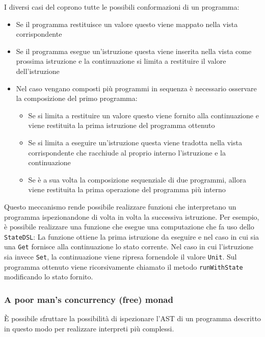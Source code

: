 I diversi casi del  coprono tutte le possibili conformazioni di un programma:
\begin{itemize}
  \item Se il programma restituisce un valore questo viene mappato nella vista corrispondente
  \item Se il programma esegue un'istruzione questa viene inserita nella vista come prossima istruzione e la continuazione si limita a restituire il valore dell'istruzione
  \item Nel caso vengano composti più programmi in sequenza è necessario osservare la composizione del primo programma:
        \begin{itemize}
          \item Se si limita a restituire un valore questo viene fornito alla continuazione e viene restituita la prima istruzione del programma ottenuto
          \item Se si limita a eseguire un'istruzione questa viene tradotta nella vista corrispondente che racchiude al proprio interno l'istruzione e la continuazione
          \item Se è a sua volta la composizione sequenziale di due programmi, allora viene restituita la prima operazione del programma più interno
        \end{itemize}
\end{itemize}

Questo meccanismo rende possibile realizzare funzioni che interpretano un programma ispezionandone di volta in volta la successiva istruzione. Per esempio, è possibile realizzare una funzione che esegue una computazione che fa uso dello \lstinline{StateDSL}:
La funzione ottiene la prima istruzione da eseguire e nel caso in cui sia una \lstinline{Get} fornisce alla continuazione lo stato corrente. Nel caso in cui l'istruzione sia invece \lstinline{Set}, la continuazione viene ripresa fornendole il valore \lstinline{Unit}. Sul programma ottenuto viene ricorsivamente chiamato il metodo \lstinline{runWithState} modificando lo stato fornito.

\subsubsection{A poor man’s concurrency (free) monad}
\label{sec:poor-man}
È possibile sfruttare la possibilità di ispezionare l'\ac{AST} di un programma descritto in questo modo per realizzare interpreti più complessi.

